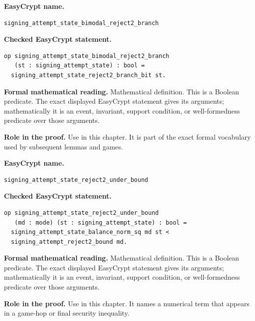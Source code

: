 \begin{formaldefinition}
\noindent\textbf{EasyCrypt name.}
\begin{lstlisting}[language=EasyCrypt,basicstyle=\ttfamily\scriptsize]
signing_attempt_state_bimodal_reject2_branch
\end{lstlisting}
\noindent\textbf{Checked EasyCrypt statement.}
\begin{lstlisting}[language=EasyCrypt,basicstyle=\ttfamily\scriptsize]
op signing_attempt_state_bimodal_reject2_branch
   (st : signing_attempt_state) : bool =
  signing_attempt_state_reject2_branch_bit st.
\end{lstlisting}
\noindent\textbf{Formal mathematical reading.}
Mathematical definition. This is a Boolean predicate.  The exact displayed EasyCrypt statement gives its arguments; mathematically it is an event, invariant, support condition, or well-formedness predicate over those arguments.

\noindent\textbf{Role in the proof.}
Use in this chapter. It is part of the exact formal vocabulary used by subsequent lemmas and games.

\end{formaldefinition}

\begin{formaldefinition}
\noindent\textbf{EasyCrypt name.}
\begin{lstlisting}[language=EasyCrypt,basicstyle=\ttfamily\scriptsize]
signing_attempt_state_reject2_under_bound
\end{lstlisting}
\noindent\textbf{Checked EasyCrypt statement.}
\begin{lstlisting}[language=EasyCrypt,basicstyle=\ttfamily\scriptsize]
op signing_attempt_state_reject2_under_bound
   (md : mode) (st : signing_attempt_state) : bool =
  signing_attempt_state_balance_norm_sq md st <
  signing_attempt_reject2_bound md.
\end{lstlisting}
\noindent\textbf{Formal mathematical reading.}
Mathematical definition. This is a Boolean predicate.  The exact displayed EasyCrypt statement gives its arguments; mathematically it is an event, invariant, support condition, or well-formedness predicate over those arguments.

\noindent\textbf{Role in the proof.}
Use in this chapter. It names a numerical term that appears in a game-hop or final security inequality.

\end{formaldefinition}

